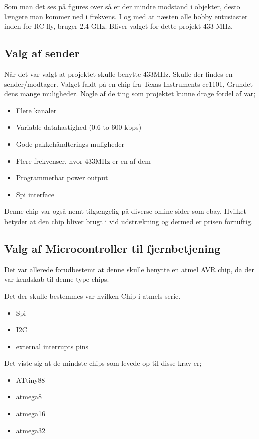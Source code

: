 \documentclass[Main]{subfiles}
\begin{document}
Som man det ses på figures over så er der mindre modstand i objekter, desto længere man kommer ned i frekvens.
I og med at næsten alle hobby entusiaster inden for RC fly, bruger 2.4 GHz. 
Bliver valget for dette projekt 433 MHz.

\subsection{Valg af sender}

Når det var valgt at projektet skulle benytte 433MHz. Skulle der findes en sender/modtager.
Valget faldt på en chip fra Texas Instruments cc1101, Grundet dens mange muligheder.
Nogle af de ting som projektet kunne drage fordel af var;

\begin{itemize}
\item Flere kanaler
\item Variable datahastighed (0.6 to 600 kbps)
\item Gode pakkehåndterings muligheder 
\item Flere frekvenser, hvor 433MHz er en af dem
\item Programmerbar power output
\item Spi interface
\end{itemize}

Denne chip var også nemt tilgængelig på diverse online sider som ebay. Hvilket betyder at den chip bliver brugt i vid udstrækning og dermed er prisen fornuftig.
\\
\subsection{Valg af Microcontroller til fjernbetjening}

Det var allerede forudbestemt at denne skulle benytte en atmel AVR chip, da der var kendskab til denne type chips.

Det der skulle bestemmes var hvilken Chip i atmels serie.

\begin{itemize}
\item Spi
\item I2C
\item external interrupts pins
\end{itemize}

Det viste sig at de mindste chips som levede op til disse krav er;

\begin{itemize}
\item ATtiny88
\item atmega8
\item atmega16
\item atmega32
\end{itemize}
\end{document}

